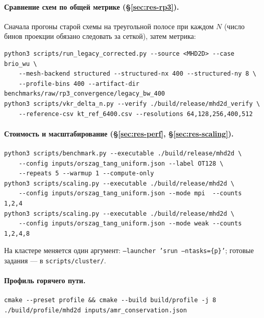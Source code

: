 \documentclass[12pt,a4paper]{article}
\newcommand{\code}[1]{\texttt{#1}}
\begin{document}
\paragraph{Сравнение схем по общей метрике (\S\ref{sec:res-rp3}).}
Сначала прогоны старой схемы на треугольной полосе при каждом $N$ (число бинов
проекции обязано следовать за сеткой), затем метрика:
\begin{verbatim}
python3 scripts/run_legacy_corrected.py --source <MHD2D> --case brio_wu \
    --mesh-backend structured --structured-nx 400 --structured-ny 8 \
    --profile-bins 400 --artifact-dir benchmarks/raw/rp3_convergence/legacy_bw_400
python3 scripts/vkr_delta_n.py --verify ./build/release/mhd2d_verify \
    --reference-csv kt_ref_6400.csv --resolutions 64,128,256,400,512
\end{verbatim}

\paragraph{Стоимость и масштабирование (\S\ref{sec:res-perf},
\S\ref{sec:res-scaling}).}
\begin{verbatim}
python3 scripts/benchmark.py --executable ./build/release/mhd2d \
    --config inputs/orszag_tang_uniform.json --label OT128 \
    --repeats 5 --warmup 1 --compute-only
python3 scripts/scaling.py --executable ./build/release/mhd2d \
    --config inputs/orszag_tang_uniform.json --mode mpi  --counts 1,2,4
python3 scripts/scaling.py --executable ./build/release/mhd2d \
    --config inputs/orszag_tang_uniform.json --mode weak --counts 1,2,4,8
\end{verbatim}
На кластере меняется один аргумент: \code{--launcher 'srun --ntasks=\{p\}'};
готовые задания --- в \code{scripts/cluster/}.

\paragraph{Профиль горячего пути.}
\begin{verbatim}
cmake --preset profile && cmake --build build/profile -j 8
./build/profile/mhd2d inputs/amr_conservation.json
\end{verbatim}
\end{document}
